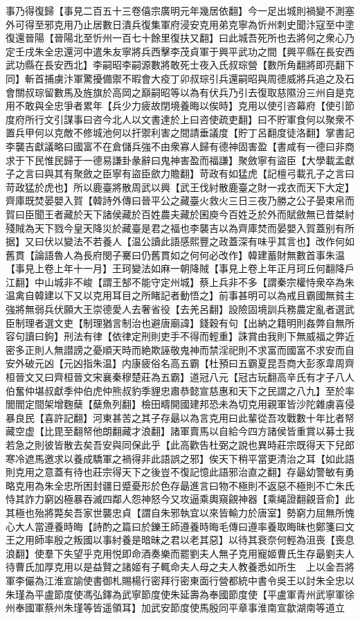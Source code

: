 事乃得復歸【事見二百五十三卷僖宗廣明元年幾居依翻】今一足出城則禍變不測塞外可得至邪克用乃止居數日潰兵復集軍府浸安克用弟克寧為忻州刺史聞汴寇至中塗復還晉陽【晉陽北至忻州一百七十餘里復扶又翻】曰此城吾死所也去將何之衆心乃定壬戌朱全忠還河中遣朱友寧將兵西擊李茂貞軍于興平武功之間【興平縣在長安西武功縣在長安西北】李嗣昭李嗣源數將敢死士夜入氏叔琮營【數所角翻將即亮翻下同】斬首捕虜汴軍驚擾備禦不暇會大疫丁卯叔琮引兵還嗣昭與周德威將兵追之及石會關叔琮留數馬及旌旗於高岡之巔嗣昭等以為有伏兵乃引去復取慈隰汾三州自是克用不敢與全忠爭者累年【兵少力疲故閉境養晦以俟時】克用以使引咨幕府【使引節度府所行文引謀事曰咨今北人以文書達於上曰咨使疏吏翻】曰不貯軍食何以聚衆不置兵甲何以克敵不修城池何以扞禦利害之間請垂議度【貯丁呂翻度徒洛翻】掌書記李襲吉獻議略曰國富不在倉儲兵強不由衆寡人歸有德神固害盈【書咸有一德曰非商求于下民惟民歸于一德易謙卦彖辭曰鬼神害盈而福謙】聚斂寧有盜臣【大學載孟獻子之言曰與其有聚斂之臣寧有盜臣歛力贍翻】苛政有如猛虎【記檀弓載孔子之言曰苛政猛於虎也】所以鹿臺將散周武以興【武王伐紂散鹿臺之財一戎衣而天下大定】齊庫既焚晏嬰入賀【韓詩外傳曰晉平公之藏臺火救火三日三夜乃勝之公子晏束帛而賀曰臣聞王者藏於天下諸侯藏於百姓農夫藏於囷庾今百姓乏於外而賦斂無已昔桀紂殘賊為天下戮今皇天降災於藏臺是君之福也李襲吉以為齊庫焚而晏嬰入賀蓋别有所据】又曰伏以變法不若養人【温公讀此語感熙豐之政蓋深有味乎其言也】改作何如舊貫【論語魯人為長府閔子騫曰仍舊貫如之何何必改作】韓建蓄財無數首事朱温【事見上卷上年十一月】王珂變法如麻一朝降賊【事見上卷上年正月珂丘何翻降戶江翻】中山城非不峻【謂王郜不能守定州城】蔡上兵非不多【謂秦宗權恃衆卒為朱温禽自韓建以下又以克用耳目之所睹記者動悟之】前事甚明可以為戒且霸國無貧主強將無弱兵伏願大王崇德愛人去奢省役【去羌呂翻】設險固境訓兵務農定亂者選武臣制理者選文吏【制理猶言制治也避唐廟諱】錢穀有句【出納之籍明則姦弊自無所容句讀曰鉤】刑法有律【依律定刑則吏手不得而輕重】誅賞由我則下無威福之弊近密多正則人無譛謗之憂順天時而絶欺誣敬鬼神而禁淫祀則不求富而國富不求安而自安外破元凶【元凶指朱温】内康疲俗名高五霸【杜預曰五霸夏昆吾商大彭豕韋周齊桓晉文又曰齊桓晉文宋襄秦穆楚莊為五霸】道冠八元【冠古玩翻高辛氏有才子八人伯奮仲堪叔獻季仲伯虎仲熊叔豹季貍忠肅恭懿宣慈惠和天下之民謂之八九】至於率閭閻定間架增麴蘖【蘖魚列翻】檢田疇開國建邦恐未為切克用親軍皆沙陀雜虜喜侵暴良民【喜許記翻】河東甚苦之其子存朂以為言克用曰此輩從吾攻戰數十年比者帑藏空虚【比毘至翻帑他朗翻藏才浪翻】諸軍賣馬以自給今四方諸侯皆重賞以募士我若急之則彼皆散去矣吾安與同保此乎【此高歡告杜弼之說也異時莊宗既得天下兒郎寒冷遮馬邀求以養成驕軍之禍得非此語誤之邪】俟天下稍平當更清治之耳【如此語則克用之意蓋有待也莊宗得天下之後豈不復記憶此語邪治直之翻】存朂幼警敏有勇略克用為朱全忠所困封疆日蹙憂形於色存朂進言曰物不極則不返惡不極則不亡朱氏恃其詐力窮凶極暴吞滅四鄰人怨神怒今又攻逼乘輿窺覦神器【乘䋲證翻覦音俞】此其極也殆將斃矣吾家世襲忠貞【謂自朱邪執宜以來皆輸力於唐室】勢窮力屈無所愧心大人當遵養時晦【詩酌之篇曰於鑠王師遵養時晦毛傳曰遵率養取晦昧也鄭箋曰文王之用師率殷之叛國以事紂養是暗昧之君以老其惡】以待其衰奈何輕為沮喪【喪息浪翻】使羣下失望乎克用悦即命酒奏樂而罷劉夫人無子克用寵姬曹氏生存朂劉夫人待曹氏加厚克用以是益賢之諸姬有子輒命夫人母之夫人教養悉如所生　上以金吾將軍李儼為江淮宣諭使書御札賜楊行密拜行密東面行營都統中書令吳王以討朱全忠以朱瑾為平盧節度使馮弘鐸為武寧節度使朱延壽為奉國節度使【平盧軍青州武寧軍徐州奉國軍蔡州朱瑾等皆遥領耳】加武安節度使馬殷同平章事淮南宣歙湖南等道立